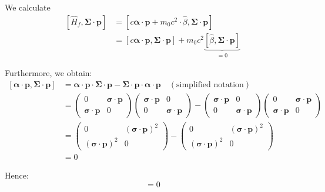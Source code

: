 We calculate
\begin{equation}
\begin{aligned}
[\hat{H}_f, \bm{\Sigma}\cdot\bm{p}] &= [c\bm{\alpha}\cdot\bm{p} + m_0 c^2 \cdot \hat{\beta}, \bm{\Sigma}\cdot\bm{p}] \\
&= [c\bm{\alpha}\cdot\bm{p}, \bm{\Sigma}\cdot\bm{p}] + m_0 c^2 \underbrace{[\hat{\beta}, \bm{\Sigma}\cdot\bm{p}]}_{=0}
\end{aligned}
\end{equation}

Furthermore, we obtain: 
\begin{equation}
\begin{aligned}
[\bm{\alpha}\cdot\bm{p}, \bm{\Sigma}\cdot\bm{p}] &= \bm{\alpha}\cdot\bm{p} \cdot \bm{\Sigma}\cdot\bm{p} - \bm{\Sigma}\cdot\bm{p} \cdot \bm{\alpha}\cdot\bm{p} \quad (\text{simplified notation}) \\
&= \begin{pmatrix} 0 & \bm{\sigma}\cdot\bm{p} \\ \bm{\sigma}\cdot\bm{p} & 0 \end{pmatrix} \begin{pmatrix} \bm{\sigma}\cdot\bm{p} & 0 \\ 0 & \bm{\sigma}\cdot\bm{p} \end{pmatrix} - \begin{pmatrix} \bm{\sigma}\cdot\bm{p} & 0 \\ 0 & \bm{\sigma}\cdot\bm{p} \end{pmatrix} \begin{pmatrix} 0 & \bm{\sigma}\cdot\bm{p} \\ \bm{\sigma}\cdot\bm{p} & 0 \end{pmatrix} \\
&= \begin{pmatrix} 0 & (\bm{\sigma}\cdot\bm{p})^2 \\ (\bm{\sigma}\cdot\bm{p})^2 & 0 \end{pmatrix} - \begin{pmatrix} 0 & (\bm{\sigma}\cdot\bm{p})^2 \\ (\bm{\sigma}\cdot\bm{p})^2 & 0 \end{pmatrix} \\
&= 0
\end{aligned}
\end{equation}

Hence:
\begin{equation}
[\hat{H}_f, \bm{\Sigma}\cdot\bm{p}] = 0
\end{equation}

